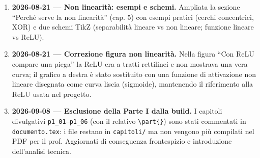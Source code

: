 \documentclass[11pt,a4paper]{report}
\begin{document}
\begin{enumerate}
  \item \textbf{2026-08-21 --- Non linearità: esempi e schemi.} Ampliata la
        sezione ``Perché serve la non linearità'' (cap. 5) con esempi pratici
        (cerchi concentrici, XOR) e due schemi TikZ (separabilità lineare vs
        non lineare; funzione lineare vs ReLU).
  \item \textbf{2026-08-21 --- Correzione figura non linearità.} Nella figura
        ``Con ReLU compare una piega'' la ReLU era a tratti rettilinei e non
        mostrava una vera curva; il grafico a destra è stato sostituito con una
        funzione di attivazione non lineare disegnata come curva liscia
        (sigmoide), mantenendo il riferimento alla ReLU usata nel progetto.
  \item \textbf{2026-09-08 --- Esclusione della Parte I dalla build.} I
        capitoli divulgativi \texttt{p1\_01}--\texttt{p1\_06} (con il relativo
        \texttt{\textbackslash part\{\}}) sono stati commentati in
        \texttt{documento.tex}: i file restano in \texttt{capitoli/} ma non
        vengono più compilati nel PDF per il prof. Aggiornati di conseguenza
        frontespizio e introduzione dell'analisi tecnica.
\end{enumerate}
\end{document}
